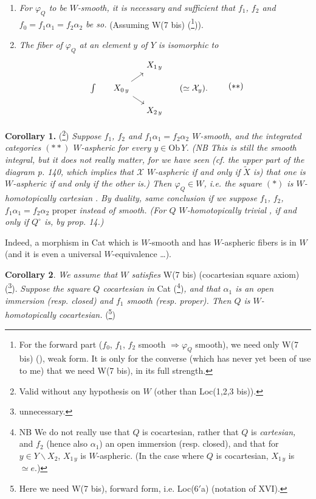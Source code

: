 \begin{enumerate}
\item[\textit{a)}] \textit{For $\varphi_Q$ to be $W$-smooth, it is necessary and sufficient that $f_1$, $f_2$ and $f_0 = f_1\alpha_1 = f_2\alpha_2$ be so.} (Assuming W(7 bis) (\footnote{For the forward part ($f_0$, $f_1$, $f_2$ smooth $\Longrightarrow \varphi_Q$ smooth), we need only W(7 bis) (\footnotemark), weak form. It is only for the converse (which has never yet been of use to me) that we need W(7 bis), in its full strength.})).

\item[\textit{b)}] \textit{The fiber of $\varphi_Q$ at an element $y$ of $Y$ is isomorphic to}
\[
\begin{tikzcd}[row sep=small, column sep=small]
 & & X_{1\,y} & \\
\int &[-1.2em] X_{0\,y} \arrow[ur] \arrow[dr] & &[2em] (\simeq \mathcal{X}_y). \\
 & & X_{2\,y} &
\end{tikzcd}
\tag*{$(**)$}
\]
\end{enumerate}

\textbf{Corollary 1.} (\footnote{Valid without any hypothesis on $W$ (other than Loc(1,2,3 bis)).}) \textit{Suppose $f_1$, $f_2$ and $f_1\alpha_1 = f_2\alpha_2$ $W$-smooth, and the integrated categories $(**)$ $W$-aspheric for every $y \in \mathrm{Ob}\,Y$. (NB This is still the smooth integral, but it does not really matter, for we have seen (cf. the upper part of the diagram p. 140, which implies that $\mathcal{X}$} \textit{$W$-aspheric if and only if $\tilde{X}$ is) that one is $W$-aspheric if and only if the other is.) Then $\varphi_Q \in W$, i.e. the square $(*)$ is $W$-homotopically cartesian} \textit{. By duality, same conclusion if we suppose $f_1$, $f_2$, $f_1\alpha_1 = f_2\alpha_2$} proper \textit{instead of smooth. (For $Q$ $W$-homotopically trivial} \textit{, if and only if $Q^\circ$ is, by} \textit{prop. 14.)}

Indeed, a morphism in Cat which is $W$-smooth and has $W$-aspheric fibers is in $W$ (and it is even a universal $W$-equivalence \dots).

\textbf{Corollary 2}. \textit{We assume that $W$ satisfies} W(7 bis) (cocartesian square axiom) (\footnote{unnecessary.}).
\textit{Suppose the square $Q$ cocartesian in} Cat (\footnote{NB We do not really use that $Q$ is cocartesian, rather that $Q$ is \textit{cartesian,} and $f_2$ (hence also $\alpha_1$) an open immersion (resp. closed), and that for $y \in Y\backslash X_2$, $X_{1\,y}$ is $W$-aspheric. (In the case where $Q$ is cocartesian, $X_{1\,y}$ is $\simeq e$.)})\textit{, and that $\alpha_1$ is an open immersion (resp. closed) and $f_1$ smooth (resp. proper). Then $Q$ is $W$-homotopically cocartesian.} (\footnote{Here we need W(7 bis), forward form, i.e. Loc(6$'$a) (notation of XVI).})

